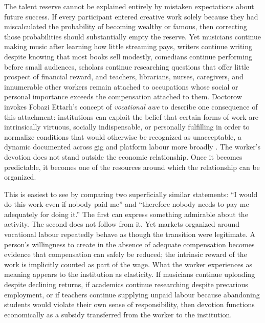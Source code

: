 \documentclass[11pt]{article}
\begin{document}
The talent reserve cannot be explained entirely by mistaken expectations about future success. If every participant entered creative work solely because they had miscalculated the probability of becoming wealthy or famous, then correcting those probabilities should substantially empty the reserve. Yet musicians continue making music after learning how little streaming pays, writers continue writing despite knowing that most books sell modestly, comedians continue performing before small audiences, scholars continue researching questions that offer little prospect of financial reward, and teachers, librarians, nurses, caregivers, and innumerable other workers remain attached to occupations whose social or personal importance exceeds the compensation attached to them. Doctorow invokes Fobazi Ettarh's concept of \emph{vocational awe} \parencite{ettarh2018vocationalawe} to describe one consequence of this attachment: institutions can exploit the belief that certain forms of work are intrinsically virtuous, socially indispensable, or personally fulfilling in order to normalize conditions that would otherwise be recognized as unacceptable, a dynamic documented across gig and platform labour more broadly \parencite{rosenblat2018uberland,gray2019ghostwork,wood2020goodgig}. The worker's devotion does not stand outside the economic relationship. Once it becomes predictable, it becomes one of the resources around which the relationship can be organized.

This is easiest to see by comparing two superficially similar statements: ``I would do this work even if nobody paid me'' and ``therefore nobody needs to pay me adequately for doing it.'' The first can express something admirable about the activity. The second does not follow from it. Yet markets organized around vocational labour repeatedly behave as though the transition were legitimate. A person's willingness to create in the absence of adequate compensation becomes evidence that compensation can safely be reduced; the intrinsic reward of the work is implicitly counted as part of the wage. What the worker experiences as meaning appears to the institution as elasticity. If musicians continue uploading despite declining returns, if academics continue researching despite precarious employment, or if teachers continue supplying unpaid labour because abandoning students would violate their own sense of responsibility, then devotion functions economically as a subsidy transferred from the worker to the institution.
\end{document}
